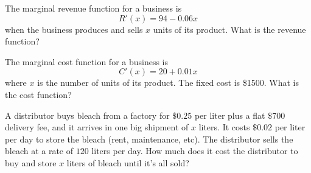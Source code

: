 
\begin{ProblemSet}[pencil space=3in]
 \begin{Problem}
  The marginal revenue function for a business is
  \begin{equation*}
   R'(x) = 94 - 0.06 x
  \end{equation*}
  when the business produces and sells $x$ units of its product.
  What is the revenue function?
 \end{Problem}
 \begin{Problem}
  The marginal cost function for a business is
  \begin{equation*}
   C'(x) = 20 + 0.01 x
  \end{equation*}
  where $x$ is the number of units of its product.
  The fixed cost is \$1500.
  What is the cost function?
 \end{Problem}

 \begin{Problem}
  A distributor buys bleach from a factory for $\$0.25$ per liter plus a flat $\$700$ delivery fee, and it arrives in one big shipment of $x$ liters.
  It costs $\$0.02$ per liter per day to store the bleach (rent, maintenance, etc).
  The distributor sells the bleach at a rate of $120$ liters per day.
  How much does it cost the distributor to buy and store $x$ liters of bleach until it's all sold?
 \end{Problem}
\end{ProblemSet}

